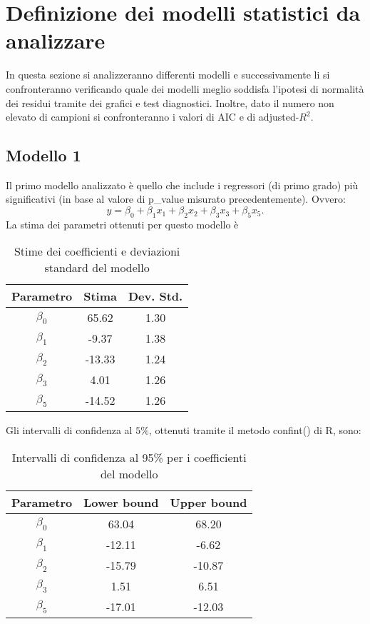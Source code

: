 \section{Definizione dei modelli statistici da analizzare}
In questa sezione si analizzeranno differenti modelli e successivamente li si confronteranno verificando quale dei modelli meglio soddisfa l'ipotesi di normalità dei residui tramite dei grafici e test diagnostici. Inoltre, dato il numero non elevato di campioni si confronteranno i valori di AIC e di adjusted-$R^2$.


\subsection{Modello 1}
Il primo modello analizzato è quello che include i regressori (di primo grado) più significativi (in base al valore di p\_value misurato precedentemente). Ovvero:
\begin{equation*}
y=\beta_0+\beta_1x_1+\beta_2x_2+\beta_3x_3+\beta_5x_5.
\end{equation*}
La stima dei parametri ottenuti per questo modello è
\begin{table}[H]
	\centering
	\begin{tabular}{|c|c|c|}
		\hline
		\textbf{Parametro} & \textbf{Stima} & \textbf{Dev. Std.} \\
		\hline
		$\beta_0$ & 65.62  & 1.30 \\
		$\beta_1$ & -9.37  & 1.38 \\
		$\beta_2$ & -13.33 & 1.24 \\
		$\beta_3$ & 4.01   & 1.26 \\
		$\beta_5$ & -14.52 & 1.26 \\
		\hline
	\end{tabular}
	\caption{Stime dei coefficienti e deviazioni standard del modello}
	\label{tab:coef_estimates}
\end{table}

Gli intervalli di confidenza al $5\%$, ottenuti tramite il metodo confint() di R, sono:
\begin{table}[H]
	\centering
	\begin{tabular}{|c|c|c|}
		\hline
		\textbf{Parametro} & \textbf{Lower bound} & \textbf{Upper bound} \\
		\hline
		$\beta_0$ & 63.04 & 68.20 \\
		$\beta_1$ & -12.11 & -6.62 \\
		$\beta_2$ & -15.79 & -10.87 \\
		$\beta_3$ & 1.51 & 6.51 \\
		$\beta_5$ & -17.01 & -12.03 \\
		\hline
	\end{tabular}
	\caption{Intervalli di confidenza al 95\% per i coefficienti del modello}
	\label{tab:ci_coefficienti}
\end{table}

